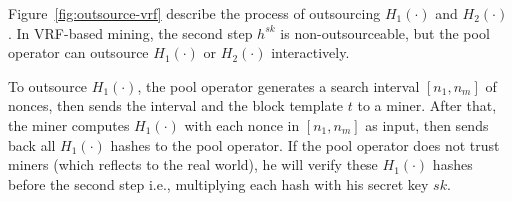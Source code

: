 








Figure~\ref{fig:outsource-vrf} describe the process of outsourcing $H_1(\cdot)$ and $H_2(\cdot)$.
In VRF-based mining, the second step $h^{sk}$ is non-outsourceable, but the pool operator can outsource $H_1(\cdot)$ or $H_2(\cdot)$ interactively.

To outsource $H_1(\cdot)$, the pool operator generates a search interval $[n_1, n_m]$ of nonces, then sends the interval and the block template $t$ to a miner.
After that, the miner computes $H_1(\cdot)$ with each nonce in $[n_1, n_m]$ as input, then sends back all $H_1(\cdot)$ hashes to the pool operator.
If the pool operator does not trust miners (which reflects to the real world), he will verify these $H_1(\cdot)$ hashes before the second step i.e., multiplying each hash with his secret key $sk$.

